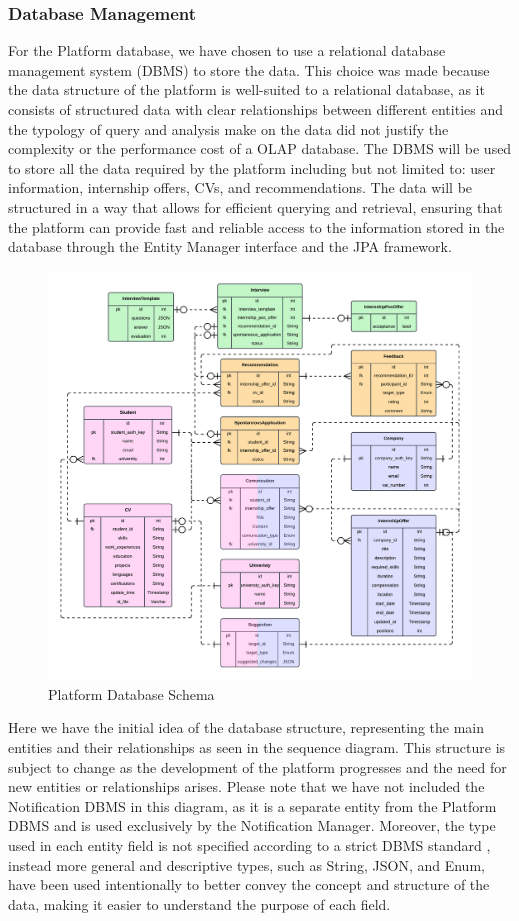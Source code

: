\subsubsection*{Database Management}
    For the Platform database, we have chosen to use a relational database management system (DBMS) to store the data. This choice was made because the data structure of the platform is well-suited to a relational database, as it consists of structured data with clear relationships between different entities and the typology of query and analysis make on the data did not justify the complexity or the performance cost of a OLAP database.
    The DBMS will be used to store all the data required by the platform including but not limited to: user information, internship offers, CVs, and recommendations. The data will be structured in a way that allows for efficient querying and retrieval, ensuring that the platform can provide fast and reliable access to the information stored in the database through the Entity Manager interface and the JPA framework.
    \begin{figure}[H]
        \centering
        \includegraphics[width=\textwidth]{Latex/Images/DD/DatabaseSchema.png}
        \caption{Platform Database Schema}
        \label{fig:DBschema}
    \end{figure}
    \noindent Here we have the initial idea of the database structure, representing the main entities and their relationships as seen in the sequence diagram. This structure is subject to change as the development of the platform progresses and the need for new entities or relationships arises. Please note that we have not included the Notification DBMS in this diagram, as it is a separate entity from the Platform DBMS and is used exclusively by the Notification Manager. Moreover, the type used in each entity field is not specified according to a strict DBMS standard , instead more general and descriptive types, such as String, JSON, and Enum, have been used intentionally to better convey the concept and structure of the data, making it easier to understand the purpose of each field.
